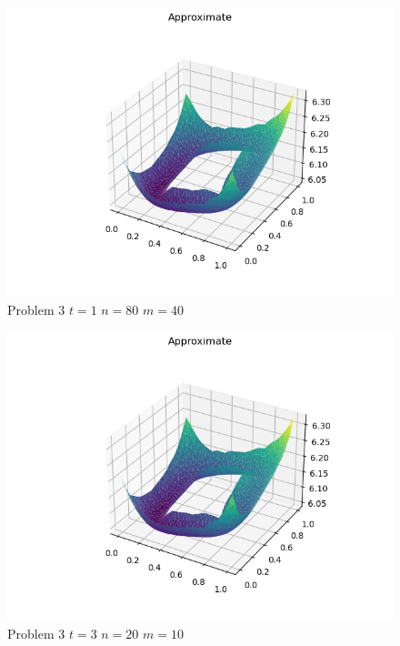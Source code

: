 \documentclass{report}
\begin{document}
\begin{figure}[h]
	\caption{Problem 3 $t = 1$ $n = 80$ $m = 40$}
	\includegraphics[width=\textwidth]{example.png}
\end{figure}
\begin{figure}[h]
	\caption{Problem 3 $t = 3$ $n = 20$ $m = 10$}
	\includegraphics[width=\textwidth]{example.png}
\end{figure}
\end{document}
